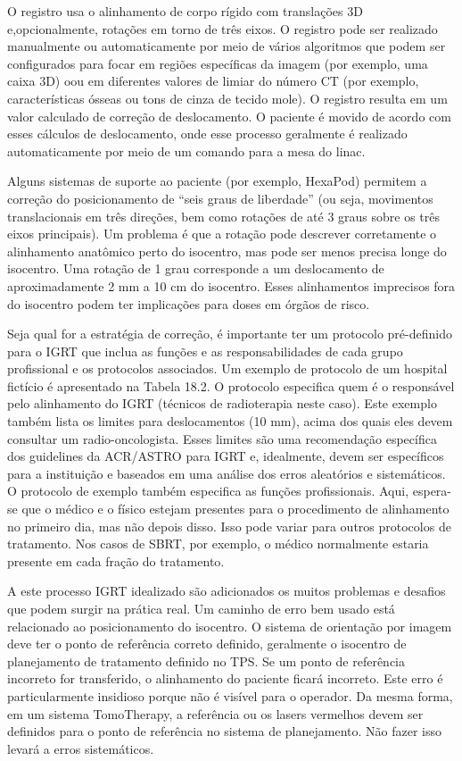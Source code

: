 \documentclass[11pt,a4paper]{article}
\newcounter{exemplo}
\begin{document}
	O registro usa o alinhamento de corpo rígido com translações 3D e,opcionalmente, rotações em torno de três eixos. O registro pode ser realizado manualmente ou automaticamente por meio de vários algoritmos que podem ser configurados para focar em regiões específicas da imagem (por exemplo, uma caixa 3D) oou em diferentes valores de limiar do número CT (por exemplo, características ósseas ou tons de cinza de tecido mole). O registro resulta em um valor calculado de correção de deslocamento. O paciente é movido de acordo com esses cálculos de deslocamento, onde esse processo geralmente é realizado automaticamente por meio de um comando para a mesa do linac. 

	Alguns sistemas de suporte ao paciente (por exemplo, HexaPod) permitem a correção do posicionamento de “seis graus de liberdade” (ou seja, movimentos translacionais em três direções, bem como rotações de até 3 graus sobre os três eixos principais). Um problema é que a rotação pode descrever corretamente o alinhamento anatômico perto do isocentro, mas pode ser menos precisa longe do isocentro. Uma rotação de 1 grau corresponde a um deslocamento de aproximadamente 2 mm a 10 cm do isocentro. Esses alinhamentos imprecisos fora do isocentro podem ter implicações para doses em órgãos de risco.

	Seja qual for a estratégia de correção, é importante ter um protocolo pré-definido para o IGRT que inclua as funções e as responsabilidades de cada grupo profissional e os protocolos associados. Um exemplo de protocolo de um hospital fictício é apresentado na Tabela 18.2. O protocolo especifica quem é o responsável pelo alinhamento do IGRT (técnicos de radioterapia neste caso). Este exemplo também lista os limites para deslocamentos (10 mm), acima dos quais eles devem consultar um radio-oncologista. Esses limites são uma recomendação específica dos guidelines da ACR/ASTRO para IGRT e, idealmente, devem ser específicos para a instituição e baseados em uma análise dos erros aleatórios e sistemáticos. O protocolo de exemplo também especifica as funções profissionais. Aqui, espera-se que o médico e o físico estejam presentes para o procedimento de alinhamento no primeiro dia, mas não depois disso. Isso pode variar para outros protocolos de tratamento. Nos casos de SBRT, por exemplo, o médico normalmente estaria presente em cada fração do tratamento.

	A este processo IGRT idealizado são adicionados os muitos problemas e desafios que podem surgir na prática real. Um caminho de erro bem usado está relacionado ao posicionamento do isocentro. O sistema de orientação por imagem deve ter o ponto de referência correto definido, geralmente o isocentro de planejamento de tratamento definido no TPS. Se um ponto de referência incorreto for transferido, o alinhamento do paciente ficará incorreto. Este erro é particularmente insidioso porque não é visível para o operador. Da mesma forma, em um sistema TomoTherapy, a referência ou os lasers vermelhos devem ser definidos para o ponto de referência no sistema de planejamento. Não fazer isso levará a erros sistemáticos.
\end{document}

